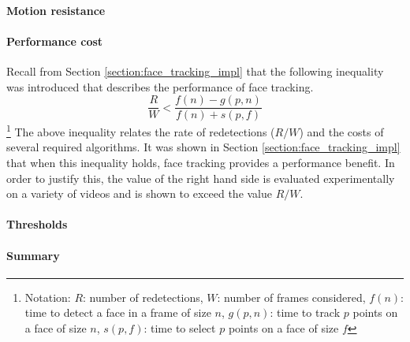 \paragraph{Motion resistance}

\paragraph{Performance cost}
Recall from Section \ref{section:face_tracking_impl} that the following inequality was introduced that describes the performance of face tracking.
\begin{equation*}
    \frac{R}{W} < \frac{f(n)-g(p,n)}{f(n)+s(p,f)}
\end{equation*}\footnote{Notation: $R$: number of redetections, $W$: number of frames considered, $f(n)$: time to detect a face in a frame of size $n$, $g(p,n)$: time to track $p$ points on a face of size $n$, $s(p,f)$: time to select $p$ points on a face of size $f$ }
The above inequality relates the rate of redetections ($R/W$) and the costs of several required algorithms. It was shown in Section \ref{section:face_tracking_impl} that when this inequality holds, face tracking provides a performance benefit.
In order to justify this, the value of the right hand side is evaluated experimentally on a variety of videos and is shown to exceed the value $R/W$.



\paragraph{Thresholds}


\paragraph{Summary}


